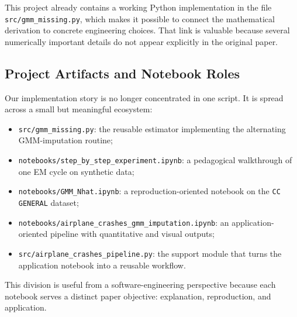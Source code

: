 This project already contains a working Python implementation in the file \texttt{src/gmm\_missing.py}, which makes it possible to connect the mathematical derivation to concrete engineering choices. That link is valuable because several numerically important details do not appear explicitly in the original paper.

\subsection{Project Artifacts and Notebook Roles}
Our implementation story is no longer concentrated in one script. It is spread across a small but meaningful ecosystem:
\begin{itemize}
    \item \texttt{src/gmm\_missing.py}: the reusable estimator implementing the alternating GMM-imputation routine;
    \item \texttt{notebooks/step\_by\_step\_experiment.ipynb}: a pedagogical walkthrough of one EM cycle on synthetic data;
    \item \texttt{notebooks/GMM\_Nhat.ipynb}: a reproduction-oriented notebook on the \texttt{CC GENERAL} dataset;
    \item \texttt{notebooks/airplane\_crashes\_gmm\_imputation.ipynb}: an application-oriented pipeline with quantitative and visual outputs;
    \item \texttt{src/airplane\_crashes\_pipeline.py}: the support module that turns the application notebook into a reusable workflow.
\end{itemize}

This division is useful from a software-engineering perspective because each notebook serves a distinct paper objective: explanation, reproduction, and application.

